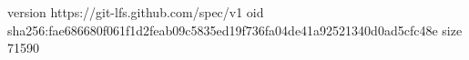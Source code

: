 version https://git-lfs.github.com/spec/v1
oid sha256:fae686680f061f1d2feab09c5835ed19f736fa04de41a92521340d0ad5cfc48e
size 71590
